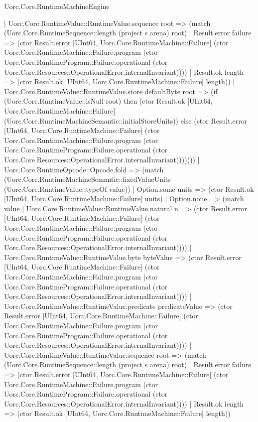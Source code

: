 \begin{lexlean}{Uorc.Core.RuntimeMachineEngine}
\begin{semanticmodule}
{              | Uorc.Core.RuntimeValue::RuntimeValue.sequence root => (match (Uorc.Core.RuntimeSequence::length (project s arena) root)
                | Result.error failure => (ctor Result.error [UInt64, Uorc.Core.RuntimeMachine::Failure] (ctor Uorc.Core.RuntimeMachine::Failure.program (ctor Uorc.Core.RuntimeProgram::Failure.operational (ctor Uorc.Core.Resources::OperationalError.internalInvariant))))
                | Result.ok length => (ctor Result.ok [UInt64, Uorc.Core.RuntimeMachine::Failure] length))
              | Uorc.Core.RuntimeValue::RuntimeValue.store defaultByte root => (if (Uorc.Core.RuntimeValue::isNull root) then (ctor Result.ok [UInt64, Uorc.Core.RuntimeMachine::Failure] (Uorc.Core.RuntimeMachineSemantic::initialStoreUnits)) else (ctor Result.error [UInt64, Uorc.Core.RuntimeMachine::Failure] (ctor Uorc.Core.RuntimeMachine::Failure.program (ctor Uorc.Core.RuntimeProgram::Failure.operational (ctor Uorc.Core.Resources::OperationalError.internalInvariant)))))))
          | Uorc.Core.RuntimeOpcode::Opcode.fold => (match (Uorc.Core.RuntimeMachineSemantic::fixedValueUnits (Uorc.Core.RuntimeValue::typeOf value))
            | Option.some units => (ctor Result.ok [UInt64, Uorc.Core.RuntimeMachine::Failure] units)
            | Option.none => (match value
              | Uorc.Core.RuntimeValue::RuntimeValue.natural n => (ctor Result.error [UInt64, Uorc.Core.RuntimeMachine::Failure] (ctor Uorc.Core.RuntimeMachine::Failure.program (ctor Uorc.Core.RuntimeProgram::Failure.operational (ctor Uorc.Core.Resources::OperationalError.internalInvariant))))
              | Uorc.Core.RuntimeValue::RuntimeValue.byte byteValue => (ctor Result.error [UInt64, Uorc.Core.RuntimeMachine::Failure] (ctor Uorc.Core.RuntimeMachine::Failure.program (ctor Uorc.Core.RuntimeProgram::Failure.operational (ctor Uorc.Core.Resources::OperationalError.internalInvariant))))
              | Uorc.Core.RuntimeValue::RuntimeValue.predicate predicateValue => (ctor Result.error [UInt64, Uorc.Core.RuntimeMachine::Failure] (ctor Uorc.Core.RuntimeMachine::Failure.program (ctor Uorc.Core.RuntimeProgram::Failure.operational (ctor Uorc.Core.Resources::OperationalError.internalInvariant))))
              | Uorc.Core.RuntimeValue::RuntimeValue.sequence root => (match (Uorc.Core.RuntimeSequence::length (project s arena) root)
                | Result.error failure => (ctor Result.error [UInt64, Uorc.Core.RuntimeMachine::Failure] (ctor Uorc.Core.RuntimeMachine::Failure.program (ctor Uorc.Core.RuntimeProgram::Failure.operational (ctor Uorc.Core.Resources::OperationalError.internalInvariant))))
                | Result.ok length => (ctor Result.ok [UInt64, Uorc.Core.RuntimeMachine::Failure] length))
}
\end{semanticmodule}
\end{lexlean}
